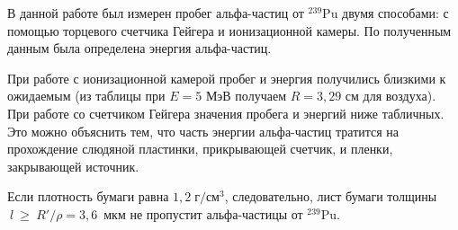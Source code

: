 \documentclass[a4paper, 12pt]{article}
\begin{document}
В данной работе был измерен пробег альфа-частиц от $ ^{239}  $Pu двумя способами: с помощью торцевого счетчика Гейгера и ионизационной камеры. По полученным данным была определена энергия альфа-частиц.
	
	При работе с ионизационной камерой пробег и энергия получились близкими к ожидаемым (из таблицы при $ E = 5 $ МэВ получаем $ R = 3,29 $ см для воздуха). При работе со счетчиком Гейгера значения пробега и энергий ниже табличных. Это можно объяснить тем, что часть энергии альфа-частиц тратится на прохождение слюдяной пластинки, прикрывающей счетчик, и пленки, закрывающей источник. 
	
	Если плотность бумаги равна $ 1,2 \; г/см^3 $, следовательно, лист бумаги толщины $~l~\geq~R'/\rho = 3,6 $~мкм не пропустит альфа-частицы от $ ^{239}  $Pu.
\end{document}
